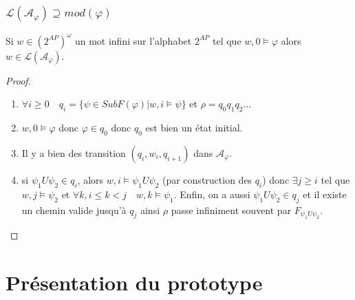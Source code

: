 \documentclass{beamer}
\theoremstyle{plain}
\theoremstyle{definition}
\begin{document}
\begin{frame}
  \frametitle{$\mathcal{L}(\mathcal{A}_\varphi) \supseteq mod(\varphi)$}
  
  \begin{lemma}
    Si $w \in (2^{AP})^\omega$ un mot infini sur l'alphabet $2^{AP}$ tel que $w, 0 \models \varphi$
    alors $w \in \mathcal{L}(\mathcal{A}_\varphi)$.
  \end{lemma}

  \pause
  
  \begin{proof}
    \begin{enumerate}[<+->]
    \item $\forall i \geq 0 \quad q_i = \{ \psi \in SubF(\varphi) | w, i \models \psi\}$ et
      $\rho = q_0q_1q_2\dots$
    \item $w, 0 \models \varphi$ donc $\varphi \in q_0$ donc $q_0$ est bien un état initial.
    \item Il y a bien des transition $(q_i, w_i, q_{i+1})$ dans $\mathcal{A}_\varphi$.
    \item si $\psi_1 U \psi_2 \in q_i$, alors $w, i \models \psi_1 U \psi_2$ (par construction des $q_i$)
    donc $\exists j \geq i$ tel que $w,j \models \psi_2$ et $\forall k, i \leq k < j \quad w, k \models \psi_1$.
    Enfin, on a aussi $\psi_1 U \psi_2 \in q_j$ et il existe un chemin valide jusqu'à $q_j$ ainsi $\rho$ passe infiniment souvent par $F_{\psi_1 U \psi_2}$.
    \end{enumerate}    
  \end{proof}
\end{frame}

\section{Présentation du prototype}
\begin{frame}
  
\end{frame}
\end{document}
